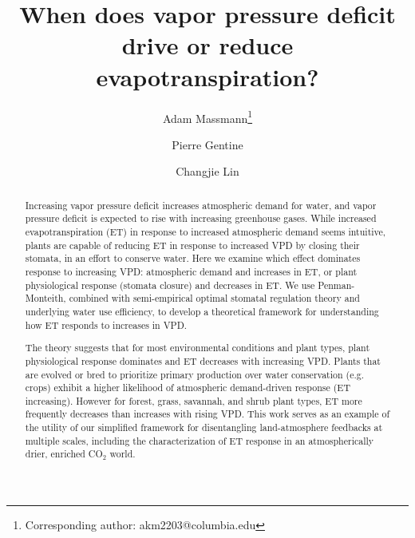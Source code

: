 \documentclass[12pt]{article}
\begin{document}
\title{When does vapor pressure deficit drive or reduce
  evapotranspiration?}

\author[1]{Adam Massmann\thanks{Corresponding author: akm2203@columbia.edu}}
\author[1]{Pierre Gentine}
\author[1,2]{Changjie Lin}


\maketitle

\begin{abstract}
  Increasing vapor pressure deficit increases atmospheric demand for water, and vapor pressure deficit is expected to rise with increasing greenhouse gases. While increased evapotranspiration (ET) in response to increased atmospheric demand seems intuitive, plants are capable of reducing ET in response to increased VPD by closing their stomata, in an effort to conserve water. Here we examine which effect dominates response to increasing VPD: atmospheric demand and increases in ET, or plant physiological response (stomata closure) and decreases in ET. We use Penman-Monteith, combined with semi-empirical optimal stomatal regulation theory and underlying water use efficiency, to develop a theoretical framework for understanding how ET responds to increases in VPD.

 The theory suggests that for most environmental conditions and plant types, plant physiological response dominates and ET decreases with increasing VPD. Plants that are evolved or bred to prioritize primary production over water conservation (e.g. crops) exhibit a higher likelihood of atmospheric demand-driven response (ET increasing). However for forest, grass, savannah, and shrub plant types, ET more frequently decreases than increases with rising VPD. This work serves as an example of the utility of our simplified framework for disentangling land-atmosphere feedbacks at multiple scales, including the characterization of ET response in an atmospherically drier, enriched CO$_2$ world. 
\end{abstract}

\onehalfspacing


\end{document}
